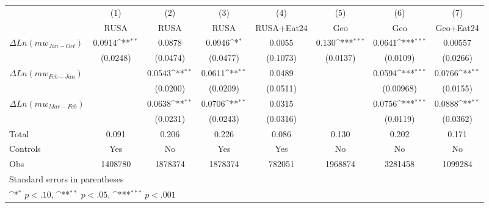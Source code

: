 {
\def\sym#1{\ifmmode^{#1}\else\(^{#1}\)\fi}
\begin{tabular}{l*{7}{c}}
\hline\hline
                    &\multicolumn{1}{c}{(1)}&\multicolumn{1}{c}{(2)}&\multicolumn{1}{c}{(3)}&\multicolumn{1}{c}{(4)}&\multicolumn{1}{c}{(5)}&\multicolumn{1}{c}{(6)}&\multicolumn{1}{c}{(7)}\\
                    &\multicolumn{1}{c}{RUSA}&\multicolumn{1}{c}{RUSA}&\multicolumn{1}{c}{RUSA}&\multicolumn{1}{c}{RUSA+Eat24}&\multicolumn{1}{c}{Geo}&\multicolumn{1}{c}{Geo}&\multicolumn{1}{c}{Geo+Eat24}\\
\hline
$\Delta Ln(mw_{Jan-Oct}) $&      0.0914\sym{**} &      0.0878         &      0.0946\sym{*}  &       0.0055         &       0.130\sym{***}&      0.0641\sym{***}&     0.00557         \\
                    &    (0.0248)         &    (0.0474)         &    (0.0477)         &    (0.1073)         &    (0.0137)         &    (0.0109)         &    (0.0266)         \\
[1em]
$\Delta Ln(mw_{Feb-Jan}) $&                     &      0.0543\sym{**} &      0.0611\sym{**} &    0.0489         &                     &      0.0594\sym{***}&      0.0766\sym{**} \\
                    &                     &    (0.0200)         &    (0.0209)         &    (0.0511)         &                     &   (0.00968)         &    (0.0155)         \\
[1em]
$\Delta Ln(mw_{Mar-Feb}) $&                     &      0.0638\sym{**} &      0.0706\sym{**} &           0.0315         &                     &      0.0756\sym{***}&      0.0888\sym{**} \\
                    &                     &    (0.0231)         &    (0.0243)         &         (0.0316)         &                     &    (0.0119)         &    (0.0362)         \\
\hline
Total & 0.091 & 0.206 & 0.226 & 0.086 & 0.130 & 0.202 & 0.171 \\
Controls & Yes & No & Yes & Yes & No & No & No \\
Obs        &     1408780         &     1878374         &     1878374         &      782051         &     1968874         &     3281458         &     1099284         \\
\hline\hline
\multicolumn{8}{l}{\footnotesize Standard errors in parentheses}\\
\multicolumn{8}{l}{\footnotesize \sym{*} \(p<.10\), \sym{**} \(p<.05\), \sym{***} \(p<.001\)}\\
\end{tabular}
}
